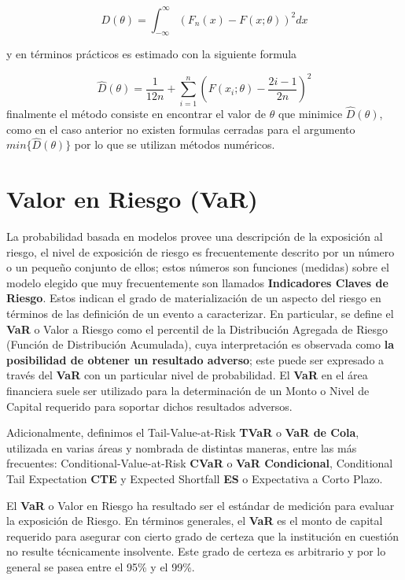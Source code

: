 \documentclass[]{article}
\begin{document}
\[D(\theta)=\int_{-\infty}^{\infty}(F_n(x)-F(x;\theta))^2dx\]

y en términos prácticos es estimado con la siguiente formula

\[\hat{D}(\theta)=\frac{1}{12n}+\sum_{i=1}^{n}\left(F(x_i ;\theta)-\frac{2i-1}{2n}\right)^2\]
finalmente el método consiste en encontrar el valor de \(\theta\) que
minimice \(\hat{D}(\theta)\), como en el caso anterior no existen
formulas cerradas para el argumento \(min\{\hat{D}(\theta)\}\) por lo
que se utilizan métodos numéricos.

\hypertarget{valor-en-riesgo-var}{%
\section{Valor en Riesgo (VaR)}\label{valor-en-riesgo-var}}

La probabilidad basada en modelos provee una descripción de la
exposición al riesgo, el nivel de exposición de riesgo es frecuentemente
descrito por un número o un pequeño conjunto de ellos; estos números son
funciones (medidas) sobre el modelo elegido que muy frecuentemente son
llamados \textbf{Indicadores Claves de Riesgo}. Estos indican el grado
de materialización de un aspecto del riesgo en términos de las
definición de un evento a caracterizar. En particular, se define el
\textbf{VaR} o Valor a Riesgo como el percentil de la Distribución
Agregada de Riesgo (Función de Distribución Acumulada), cuya
interpretación es observada como \textbf{la posibilidad de obtener un
resultado adverso}; este puede ser expresado a través del \textbf{VaR}
con un particular nivel de probabilidad. El \textbf{VaR} en el área
financiera suele ser utilizado para la determinación de un Monto o Nivel
de Capital requerido para soportar dichos resultados adversos.

Adicionalmente, definimos el Tail-Value-at-Risk \textbf{TVaR} o
\textbf{VaR de Cola}, utilizada en varias áreas y nombrada de distintas
maneras, entre las más frecuentes: Conditional-Value-at-Risk
\textbf{CVaR} o \textbf{VaR Condicional}, Conditional Tail Expectation
\textbf{CTE} y Expected Shortfall \textbf{ES} o Expectativa a Corto
Plazo.

El \textbf{VaR} o Valor en Riesgo ha resultado ser el estándar de
medición para evaluar la exposición de Riesgo. En términos generales, el
\textbf{VaR} es el monto de capital requerido para asegurar con cierto
grado de certeza que la institución en cuestión no resulte técnicamente
insolvente. Este grado de certeza es arbitrario y por lo general se
pasea entre el 95\% y el 99\%.
\end{document}
